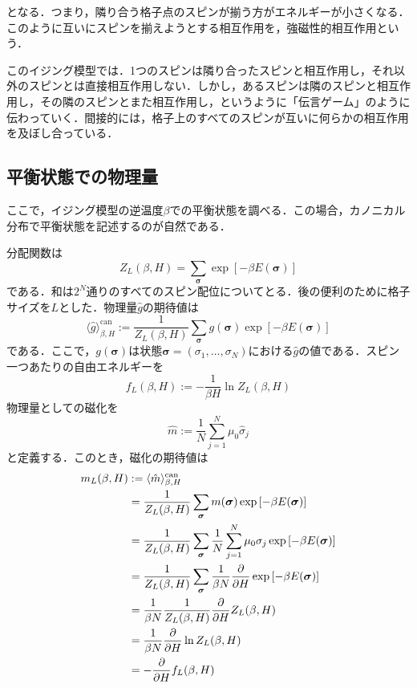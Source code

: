 \documentclass[a4paper,11pt]{jsreport}
\begin{document}
となる．つまり，隣り合う格子点のスピンが揃う方がエネルギーが小さくなる．このように互いにスピンを揃えようとする相互作用を，強磁性的相互作用という．\par
このイジング模型では．1つのスピンは隣り合ったスピンと相互作用し，それ以外のスピンとは直接相互作用しない．しかし，あるスピンは隣のスピンと相互作用し，その隣のスピンとまた相互作用し，というように「伝言ゲーム」のように伝わっていく．間接的には，格子上のすべてのスピンが互いに何らかの相互作用を及ぼし合っている．

\subsection{平衡状態での物理量}
ここで，イジング模型の逆温度$\beta$での平衡状態を調べる．この場合，カノニカル分布で平衡状態を記述するのが自然である．\par
分配関数は
\begin{equation}
  Z_L(\beta, H) = \sum_{\bm{\sigma}} \exp{[-\beta E(\bm{\sigma})]} \label{イジング分配関数}
\end{equation}
である．和は$2^N$通りのすべてのスピン配位についてとる．後の便利のために格子サイズを$L$とした．物理量$\hat{g}$の期待値は
\begin{equation}
  \langle \hat{g} \rangle_{\beta, H}^{\text{can}}
  := \frac{1}{Z_L(\beta, H)}  \sum_{\bm{\sigma}} g(\bm{\sigma}) \exp{[-\beta E(\bm{\sigma})]}
\end{equation}
である．ここで，$g(\bm{\sigma})$は状態$\bm{\sigma}=(\sigma_1,\dots,\sigma_N)$における$\hat{g}$の値である．スピン一つあたりの自由エネルギーを
\begin{equation}
  f_L(\beta, H) := -\frac{1}{\beta H} \ln{Z_L(\beta, H)} \label{自由エネルギー}
\end{equation}
物理量としての磁化を
\begin{equation}
  \hat{m} := \frac{1}{N} \sum_{j=1}^{N} \mu_0 \hat{\sigma}_j
\end{equation}
と定義する．このとき，磁化の期待値は
\begin{align}
   m_L(\beta, H) &:= \langle \hat{m} \rangle_{\beta, H}^{\text{can}} \notag                                                                                       \\
   & = \frac{1}{Z_L(\beta, H)} \sum_{\bm{\sigma}} m(\bm{\sigma}) \exp{[-\beta E(\bm{\sigma})]} \notag                \\
   & = \frac{1}{Z_L(\beta, H)} \sum_{\bm{\sigma}} \frac{1}{N} \sum_{j=1}^N \mu_0 \sigma_j \exp{[-\beta E(\bm{\sigma})]} \notag      \\
   & = \frac{1}{Z_L(\beta, H)} \sum_{\bm{\sigma}} \frac{1}{\beta N} \frac{\partial}{\partial H} \exp{[-\beta E(\bm{\sigma})]}\notag \\
   & = \frac{1}{\beta N} \frac{1}{Z_L(\beta, H)} \frac{\partial}{\partial H} Z_L(\beta, H)  \notag                                                                 \\
   & = \frac{1}{\beta N}\frac{\partial}{\partial H} \ln{Z_L (\beta, H)} \notag                                                                                     \\
   & = -\frac{\partial}{\partial H} f_L(\beta, H) \label{磁化と自由エネルギーの関係式}
\end{align}
\end{document}
